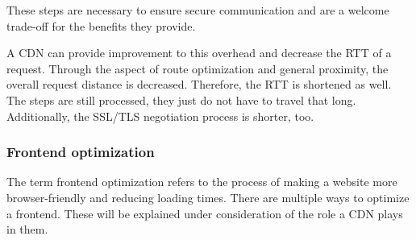 These steps are necessary to ensure secure communication and are a welcome trade-off for the benefits they provide. 

A CDN can provide improvement to this overhead and decrease the RTT of a request. Through the aspect of route optimization and general proximity, the overall request distance is decreased. Therefore, the RTT is shortened as well. The steps are still processed, they just do not have to travel that long. Additionally, the SSL/TLS negotiation process is shorter, too.\cite{cdn_ssl_tsl}

\subsubsection{Frontend optimization}

The term frontend optimization refers to the process of making a website more browser-friendly and reducing loading times. There are multiple ways to optimize a frontend. These will be explained under consideration of the role a CDN plays in them.

